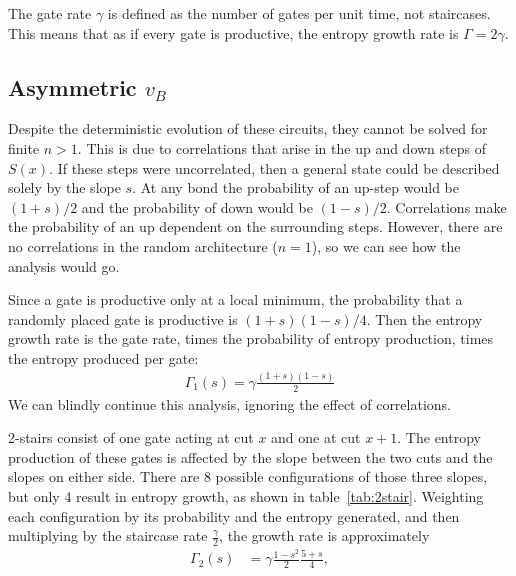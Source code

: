 \documentclass[aps,prx,reprint,superscriptaddress, longbibliography]{revtex4-1}
\begin{document}
The gate rate $\gamma$ is defined as the number of gates per unit time, not staircases.
This means that as if every gate is productive, the entropy growth rate is $\Gamma=2\gamma$.


\subsection{Asymmetric $v_B$}

Despite the deterministic evolution of these circuits, they cannot be solved for finite $n>1$. This is due to correlations that arise in the up and down steps of $S(x)$. If these steps were uncorrelated, then a general state could be described solely by the slope $s$. At any bond the probability of an up-step would be $(1+s)/2$ and the probability of down would be $(1-s)/2$. Correlations make the probability of an up dependent on the surrounding steps. However, there are no correlations in the random architecture ($n=1$), so we can see how the analysis would go.

Since a gate is productive only at a local minimum, the probability that a randomly placed gate is productive is $(1+s)(1-s)/4$. Then the entropy growth rate is the gate rate, times the probability of entropy production, times the entropy produced per gate:
\begin{align}
\Gamma_1(s)=\gamma\frac{(1+s)(1-s)}{2}
\end{align}
We can blindly continue this analysis, ignoring the effect of correlations. 


2-stairs consist of one gate acting at cut $x$ and one at cut $x+1$. The entropy production of these gates is affected by the slope between the two cuts and the slopes on either side. There are 8 possible configurations of those three slopes, but only 4 result in entropy growth, as shown in table~\ref{tab:2stair}. Weighting each configuration by its probability and the entropy generated, and then multiplying by the staircase rate $\frac{\gamma}{2}$, the growth rate is approximately
\begin{align}
\Gamma_2(s) 
&= \gamma\frac{1-s^2}{2}\frac{5+s}{4}, \label{eqn:2rate}
\end{align}
\end{document}

